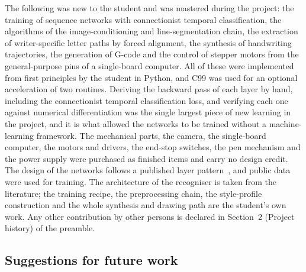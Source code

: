 The following was new to the student and was mastered during the project: the training of sequence networks with connectionist temporal classification, the algorithms of the image-conditioning and line-segmentation chain, the extraction of writer-specific letter paths by forced alignment, the synthesis of handwriting trajectories, the generation of G-code and the control of stepper motors from the general-purpose pins of a single-board computer.
All of these were implemented from first principles by the student in Python, and C99 was used for an optional acceleration of two routines.
Deriving the backward pass of each layer by hand, including the connectionist temporal classification loss, and verifying each one against numerical differentiation was the single largest piece of new learning in the project, and it is what allowed the networks to be trained without a machine-learning framework.
The mechanical parts, the camera, the single-board computer, the motors and drivers, the end-stop switches, the pen mechanism and the power supply were purchased as finished items and carry no design credit.
The design of the networks follows a published layer pattern~\cite{kizilirmak2023}, and public data were used for training.
The architecture of the recogniser is taken from the literature; the training recipe, the preprocessing chain, the style-profile construction and the whole synthesis and drawing path are the student's own work.
Any other contribution by other persons is declared in Section~2 (Project history) of the preamble.


\subsection{Suggestions for future work}
\label{sec:con-future}

